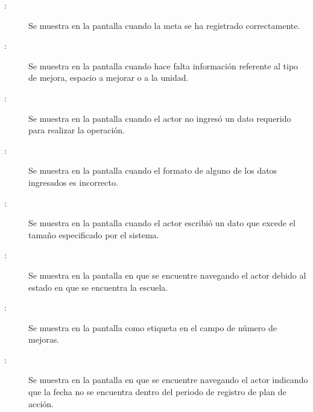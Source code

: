 \begin{description}
	\item[:] Se muestra en la pantalla  cuando la meta se ha registrado correctamente.
	\item[:] Se muestra en la pantalla  cuando hace falta información referente al tipo de mejora, espacio a mejorar o a la unidad.
	\item[:] Se muestra en la pantalla  cuando el actor no ingresó un dato requerido para realizar la operación.
	\item[:] Se muestra en la pantalla  cuando el formato de alguno de los datos ingresados es incorrecto.
	\item[:] Se muestra en la pantalla  cuando el actor escribió un dato que excede el tamaño especificado por el sistema.
		\item[:] Se muestra en la pantalla en que se encuentre navegando el actor debido al estado en que se encuentra la escuela.	
	\item[:] Se muestra en la pantalla  como etiqueta en el campo de número de mejoras.
		\item[\UCli {}:] Se muestra en la pantalla en que se encuentre navegando el actor indicando que la fecha no se encuentra dentro del periodo de registro de plan de acción.
\end{description}
